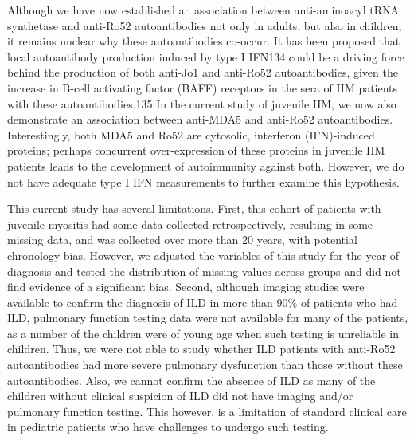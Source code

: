 Although we have now established an association between anti-aminoacyl tRNA synthetase and anti-Ro52 autoantibodies not only in adults, but also in children, it remains unclear why these autoantibodies co-occur. It has been proposed that local autoantibody production induced by type I IFN134 could be a driving force behind the production of both anti-Jo1 and anti-Ro52 autoantibodies, given the increase in B-cell activating factor (BAFF) receptors in the sera of IIM patients with these autoantibodies.135 In the current study of juvenile IIM, we now also demonstrate an association between anti-MDA5 and anti-Ro52 autoantibodies. Interestingly, both MDA5 and Ro52 are cytosolic, interferon (IFN)-induced proteins; perhaps concurrent over-expression of these proteins in juvenile IIM patients leads to the development of autoimmunity against both. However, we do not have adequate type I IFN measurements to further examine this hypothesis.

This current study has several limitations.  First, this cohort of patients with juvenile myositis had some data collected retrospectively, resulting in some missing data, and was collected over more than 20 years, with potential chronology bias. However, we adjusted the variables of this study for the year of diagnosis and tested the distribution of missing values across groups and did not find evidence of a significant bias. Second, although imaging studies were available to confirm the diagnosis of ILD in more than 90\% of patients who had ILD, pulmonary function testing data were not available for many of the patients, as a number of the children were of young age when such testing is unreliable in children. Thus, we were not able to study whether ILD patients with anti-Ro52 autoantibodies had more severe pulmonary dysfunction than those without these autoantibodies. Also, we cannot confirm the absence of ILD as many of the children without clinical suspicion of ILD did not have imaging and/or pulmonary function testing. This however, is a limitation of standard clinical care in pediatric patients who have challenges to undergo such testing.

